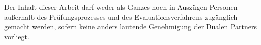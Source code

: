 
\section*{\centering \textcolor{red}{\blockingHeading}}



\noindent Der Inhalt dieser Arbeit darf weder als Ganzes noch in Auszügen Personen außerhalb des Prüfungsprozesses und des Evaluationsverfahrens zugänglich gemacht werden, sofern keine anders lautende Genehmigung der Dualen Partners vorliegt.

\vspace*{2cm}

